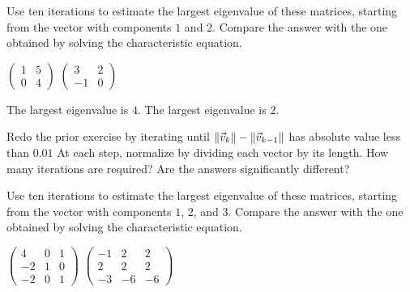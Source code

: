 \begin{exercises}
  \item 
    Use ten iterations to estimate the largest eigenvalue of these
    matrices, starting from the vector with components $1$ and $2$.
    Compare the answer with the one obtained by solving the characteristic
    equation.
    \begin{exparts*}
      \partsitem $\begin{pmatrix}
                    1  &5  \\
                    0  &4
                  \end{pmatrix}$
      \partsitem $\begin{pmatrix}
                    3   &2  \\
                    -1  &0
                  \end{pmatrix}$
    \end{exparts*}
    \begin{answer}
     \begin{exparts}
       \partsitem The largest eigenvalue is $4$.
       \partsitem The largest eigenvalue is $2$.
     \end{exparts}
    \end{answer}
  \item 
     Redo the prior exercise by iterating until 
     $\|\vec{v}_k\|-\|\vec{v}_{k-1}\|$ has absolute value less than
     $0.01$
     At each step, normalize by dividing each vector by its length.
     How many iterations are required?
     Are the answers significantly different?
  \item 
    Use ten iterations to estimate the largest eigenvalue of these
    matrices, starting from the vector with components $1$, $2$, and $3$.
    Compare the answer with the one obtained by solving the characteristic
    equation.
    \begin{exparts*}
      \partsitem $\begin{pmatrix}
                    4   &0  &1 \\
                    -2  &1  &0  \\
                    -2  &0  &1
                  \end{pmatrix}$
      \partsitem $\begin{pmatrix}
                   -1  &2  &2  \\
                    2  &2  &2  \\
                   -3  &-6 &-6
                  \end{pmatrix}$

\end{exparts*}
\end{exercises}
